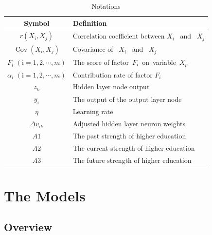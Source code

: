 \documentclass[12pt]{article}  %
\begin{document}
\begin{table}[!htbp]
\begin{center}
\caption{Notations}
\begin{tabular}{cl}
	\toprule
	\multicolumn{1}{m{3cm}}{\centering Symbol}
	&\multicolumn{1}{m{8cm}}{\centering Definition}\\
	\midrule
	
	$r\left(X_{i},X_{j}\right)$&Correlation coefficient between  $X_{i}$ \ and \  $X_{j}$\\
	
	$\operatorname{Cov}\left(X_{i}, X_{j}\right)$&Covariance of  \ $X_{i}$ \ and \ $X_{j}$\\
	
	
	$F_{i}$
    $\left(\mathrm{i}=1, 2, \cdots, m\right)$&The score of factor\ $F_{i}$\ on\ variable\ $X_{p}$\\
	
	$\alpha_{i}$
    $\left(\mathrm{i}=1, 2, \cdots, m\right)$&Contribution rate of factor $F_{i}$\\
	
	$z_{k}$&Hidden layer node output\\


	$y_{i}$&The output of the output layer node\\
	
	$\eta$ &Learning rate\\

	$\Delta v_{ik}$ &Adjusted hidden layer neuron weights\\
	
	$A1$ &The past strength of higher education\\
	$A2$ &The current strength of higher education\\
	$A3$ &The future strength of higher education\\
	\bottomrule

	
	
\end{tabular}\label{tb:notation}
\end{center}
\end{table}









\section{The Models}
\subsection{Overview}
\end{document}

